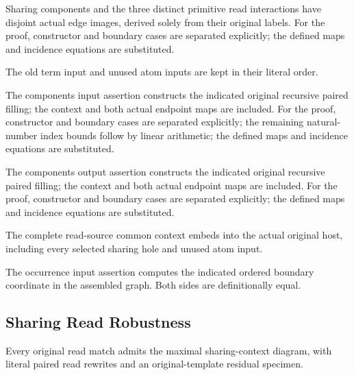 Sharing components and the three distinct primitive read interactions have disjoint actual edge images, derived solely from their original labels.
For the proof, constructor and boundary cases are separated explicitly; the defined maps and incidence equations are substituted.
\par{}

The old term input and unused atom inputs are kept in their literal order.
\par{}

The components input assertion constructs the indicated original recursive paired filling; the context and both actual endpoint maps are included.
For the proof, constructor and boundary cases are separated explicitly; the remaining natural-number index bounds follow by linear arithmetic; the defined maps and incidence equations are substituted.
\par{}

The components output assertion constructs the indicated original recursive paired filling; the context and both actual endpoint maps are included.
For the proof, constructor and boundary cases are separated explicitly; the defined maps and incidence equations are substituted.
\par{}

The complete read-source common context embeds into the actual original host, including every selected sharing hole and unused atom input.
\par{}

The occurrence input assertion computes the indicated ordered boundary coordinate in the assembled graph.
Both sides are definitionally equal.
\par{}

\subsection{Sharing Read Robustness}
Every original read match admits the maximal sharing-context diagram, with literal paired read rewrites and an original-template residual specimen.

